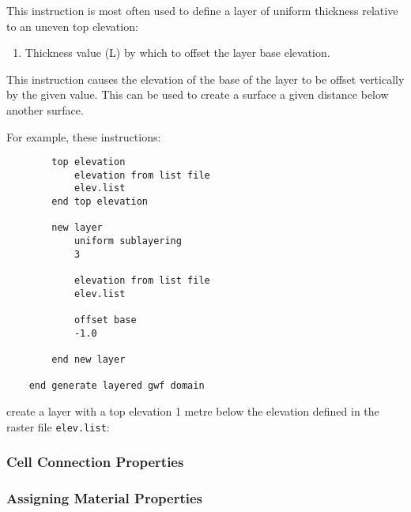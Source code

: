 {This instruction is most often used to define a layer of uniform thickness relative to an uneven top elevation:

    {\squish
    \begin{enumerate}
    \item {} Thickness value (L) by which to offset the layer base elevation.
    \end{enumerate}
    This instruction causes the elevation of the base of the layer to be offset vertically by the given value.  This
    can be used to create a surface a given distance below another surface.
}

    For example, these instructions:
\begin{verbatim}
        top elevation
            elevation from list file
            elev.list
        end top elevation

        new layer
            uniform sublayering
            3

            elevation from list file
            elev.list

            offset base
            -1.0

        end new layer

    end generate layered gwf domain
\end{verbatim}
 create a layer with a top elevation 1 metre below the elevation defined in the raster file \texttt{elev.list}:


\subsubsection{Cell Connection Properties}  




\subsubsection{Assigning Material Properties}   \label{section:matprops}

}
